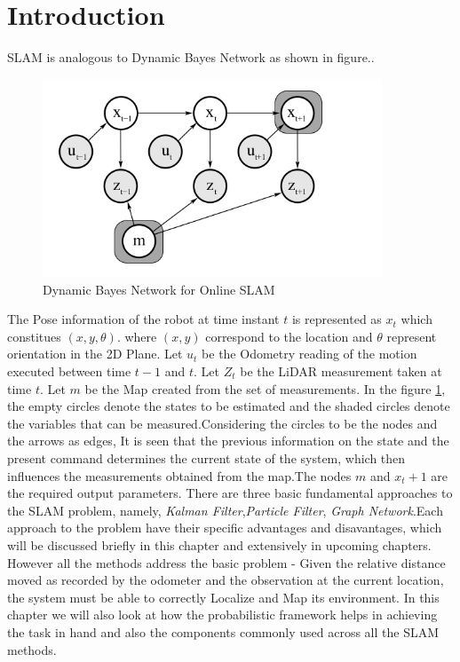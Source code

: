 \section{Introduction}
    SLAM is analogous to Dynamic Bayes Network as shown in figure..
    \begin{figure}[h] \label{fig:DBNOn}
        \includegraphics[width=0.9\textwidth]{images/DBN_Online.png}
        \caption{Dynamic Bayes Network for Online SLAM}
    \end{figure}
        The Pose information of the robot at time instant $t$ is represented as $x_t$ which constitues $(x,y,\theta)$.
where $(x,y)$ correspond to the location and $\theta$ represent orientation in the 2D Plane. Let $u_t$ be the Odometry reading of the motion executed between time $t-1$ and $t$. Let $Z_t$ be the LiDAR measurement
taken at time $t$. Let $m$ be the Map created from the set of measurements. In the figure \ref{fig:DBNOn}, the empty circles denote the states to be estimated and the shaded circles denote the variables that can be 
measured.Considering the circles to be the nodes and the arrows as edges, It is seen that the previous information on the state and the present command determines the current state of the system, which then influences the 
measurements obtained from the map.The nodes $m$ and $x_t+1$ are the required output parameters. There are three basic fundamental approaches to the SLAM problem, namely, \textit{Kalman Filter},\textit{Particle Filter},
\textit{Graph Network}.Each approach to the problem have their specific advantages and disavantages, which will be discussed briefly in this chapter and extensively in upcoming chapters.
 However all the methods address the basic problem -
Given the relative distance moved as recorded by the odometer and the observation at the current location, the system must be able to correctly Localize and Map its environment. 
In this chapter we will also look at how the probabilistic framework helps in achieving the task in hand and also the components commonly used across all the SLAM methods.
